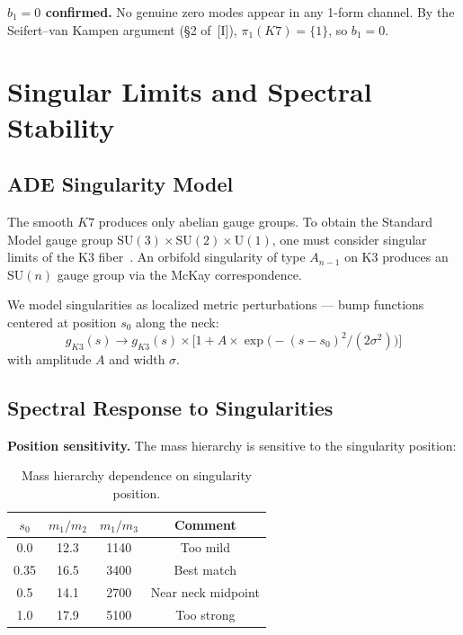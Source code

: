 \documentclass[11pt,a4paper]{article}
\newcommand{\Kseven}{K_7}
\newcommand{\SU}{\mathrm{SU}}
\newcommand{\U}{\mathrm{U}}
\theoremstyle{remark}
\def\Kseven{K7}%
\begin{document}
\textbf{$b_1 = 0$ confirmed.} No genuine zero modes appear in any 1-form channel. By the Seifert--van Kampen argument (\S2 of~[I]), $\pi_1(\Kseven) = \{1\}$, so $b_1 = 0$.

\section{Singular Limits and Spectral Stability}

\subsection{ADE Singularity Model}

The smooth $\Kseven$ produces only abelian gauge groups. To obtain the Standard Model
gauge group $\SU(3) \times \SU(2) \times \U(1)$, one must consider singular limits of the K3
fiber~\cite{ref1,ref11,ref12}. An orbifold singularity of type $A_{n-1}$ on K3 produces an $\SU(n)$
gauge group via the McKay correspondence.

We model singularities as localized metric perturbations --- bump functions centered
at position $s_0$ along the neck:
\begin{equation}
g_{K3}(s) \to g_{K3}(s) \times \big[1 + A \times \exp\!\big(-(s - s_0)^2/(2\sigma^2)\big)\big]
\end{equation}
with amplitude $A$ and width $\sigma$.

\subsection{Spectral Response to Singularities}

\textbf{Position sensitivity.} The mass hierarchy is sensitive to the singularity position:

\begin{table}[htbp]
\centering
\begin{tabular}{cccc}
\toprule
$s_0$ & $m_1/m_2$ & $m_1/m_3$ & Comment \\
\midrule
0.0 & 12.3 & 1140 & Too mild \\
0.35 & 16.5 & 3400 & Best match \\
0.5 & 14.1 & 2700 & Near neck midpoint \\
1.0 & 17.9 & 5100 & Too strong \\
\bottomrule
\end{tabular}
\caption{Mass hierarchy dependence on singularity position.}
\label{tab:position}
\end{table}
\end{document}
